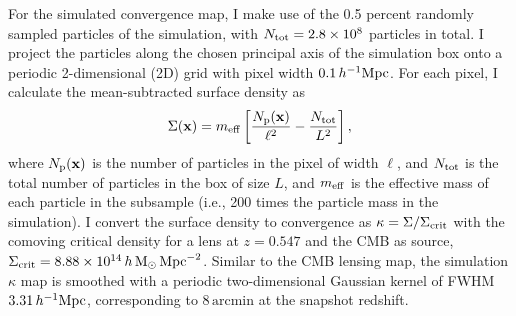 \documentclass[11pt,letterpaper]{article}
\newcommand{\hinvMpc}{h^{-1}{\rm Mpc}}
\begin{document}

For the simulated convergence map, I make use of the 0.5 percent randomly sampled particles of the simulation, with $N_{\rm tot}=2.8\times10^{8}$ particles in total.
I project the particles along the chosen principal axis of the simulation box 
onto a periodic 2-dimensional (2D) grid with pixel width $0.1\,\hinvMpc$. For each pixel, I calculate the mean-subtracted surface density as
\begin{equation}
    \Sigma(\mathbf{x})=m_{\rm eff}\left[\frac{N_{\rm p}(\mathbf{x})}{\ell^{2}}
-\frac{N_{\rm tot}}{L^{2}}\right],
\end{equation}
where $N_{\rm p}(\mathbf{x})$ is the number of particles in the pixel of width $\ell$, and $N_{\rm tot}$ is the total number of particles in the box of size $L$, and $m_{\rm eff}$ is the effective mass of each particle in the subsample (i.e., 200 times the particle mass in the simulation). I convert the surface density to convergence as $\kappa=\Sigma/\Sigma_{\rm crit}$ with the comoving critical density for a lens at $z=0.547$ and the CMB as source, $\Sigma_{\rm crit}=8.88\times10^{14}\,h\,\mathrm{M}_{\odot}\,\mathrm{Mpc}^{-2}$.
Similar to the CMB lensing map, the simulation $\kappa$ map is smoothed with a periodic two-dimensional Gaussian kernel of FWHM $3.31\,\hinvMpc$, corresponding to $8\,\mathrm{arcmin}$ at the snapshot redshift.

\end{document}
